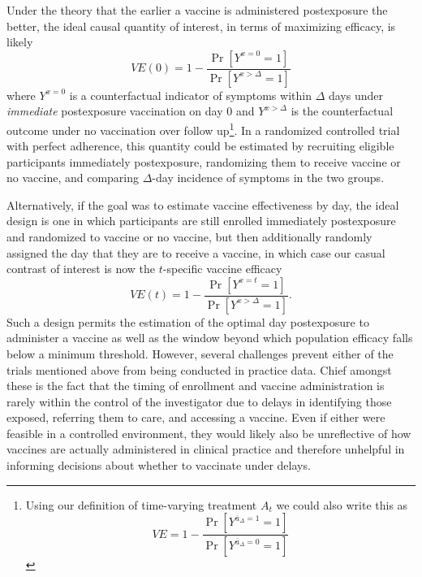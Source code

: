 \documentclass[11pt]{article}
\begin{document}
Under the theory that the earlier a vaccine is administered postexposure the better, the ideal causal quantity of interest, in terms of maximizing efficacy, is likely
$$VE(0) = 1 - \frac{\Pr[Y^{x = 0} = 1]}{\Pr[Y^{x > \Delta} = 1]}$$
where $Y^{x = 0}$ is a counterfactual indicator of symptoms within $\Delta$ days under \textit{immediate} postexposure vaccination on day 0 and $Y^{x > \Delta}$ is the counterfactual outcome under no vaccination over follow up\footnote{Using our definition of time-varying treatment $A_t$ we could also write this as $$VE = 1 - \frac{\Pr[Y^{\overline{a}_{\Delta} = 1} = 1]}{\Pr[Y^{\overline{a}_{\Delta} = 0} = 1]}$$}. In a randomized controlled trial with perfect adherence, this quantity could be estimated by recruiting eligible participants immediately postexposure, randomizing them to receive vaccine or no vaccine, and comparing $\Delta$-day incidence of symptoms in the two groups.  %

Alternatively, if the goal was to estimate vaccine effectiveness by day, the ideal design is one in which participants are still enrolled immediately postexposure and randomized to vaccine or no vaccine, but then additionally randomly assigned the day that they are to receive a vaccine, in which case our casual contrast of interest is now the $t$-specific vaccine efficacy
$$VE(t) = 1 - \frac{\Pr[Y^{x = t} = 1]}{\Pr[Y^{x > \Delta} = 1]}.$$
Such a design permits the estimation of the optimal day postexposure to administer a vaccine as well as the window beyond which population efficacy falls below a minimum threshold. However, several challenges prevent either of the trials mentioned above from being conducted in practice data. Chief amongst these is the fact that the timing of enrollment and vaccine administration is rarely within the control of the investigator due to delays in identifying those exposed, referring them to care, and accessing a vaccine.  Even if either were feasible in a controlled environment, they would likely also be unreflective of how vaccines are actually administered in clinical practice and therefore unhelpful in informing decisions about whether to vaccinate under delays. 
\end{document}
